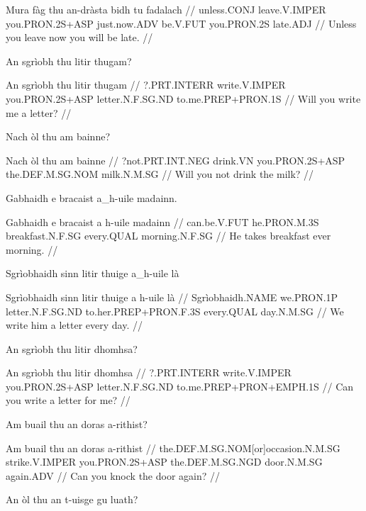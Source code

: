 \documentclass[a4paper,10pt]{article}
\begin{document}
\vspace{4mm}
\gla Mura fàg thu an-dràsta bidh tu fadalach  //
\glb unless.CONJ leave.V.IMPER you.PRON.2S+ASP just.now.ADV be.V.FUT you.PRON.2S late.ADJ  //
\glft Unless you leave now you will be late. //
\endgl
\xe

\ex
\begingl
\glpre An sgrìobh thu litir thugam? 

\vspace{4mm}
\gla An sgrìobh thu litir thugam  //
\glb ?.PRT.INTERR write.V.IMPER you.PRON.2S+ASP letter.N.F.SG.ND to.me.PREP+PRON.1S  //
\glft Will you write me a letter? //
\endgl
\xe

\ex
\begingl
\glpre Nach òl thu am bainne? 

\vspace{4mm}
\gla Nach òl thu am bainne  //
\glb ?not.PRT.INT.NEG drink.VN you.PRON.2S+ASP the.DEF.M.SG.NOM milk.N.M.SG  //
\glft Will you not drink the milk? //
\endgl
\xe

\ex
\begingl
\glpre Gabhaidh e bracaist a\_h-uile madainn. 

\vspace{4mm}
\gla Gabhaidh e bracaist {a h-uile} madainn  //
\glb can.be.V.FUT he.PRON.M.3S breakfast.N.F.SG every.QUAL morning.N.F.SG  //
\glft He takes breakfast ever morning. //
\endgl
\xe

\ex
\begingl
\glpre Sgrìobhaidh sinn litir thuige a\_h-uile là 

\vspace{4mm}
\gla Sgrìobhaidh sinn litir thuige {a h-uile} là  //
\glb Sgrìobhaidh.NAME we.PRON.1P letter.N.F.SG.ND to.her.PREP+PRON.F.3S every.QUAL day.N.M.SG  //
\glft We write him a letter every day. //
\endgl
\xe

\ex
\begingl
\glpre An sgrìobh thu litir dhomhsa? 

\vspace{4mm}
\gla An sgrìobh thu litir dhomhsa  //
\glb ?.PRT.INTERR write.V.IMPER you.PRON.2S+ASP letter.N.F.SG.ND to.me.PREP+PRON+EMPH.1S  //
\glft Can you write a letter for me? //
\endgl
\xe

\ex
\begingl
\glpre Am buail thu an doras a-rithist? 

\vspace{4mm}
\gla Am buail thu an doras a-rithist  //
\glb the.DEF.M.SG.NOM[or]occasion.N.M.SG strike.V.IMPER you.PRON.2S+ASP the.DEF.M.SG.NGD door.N.M.SG again.ADV  //
\glft Can you knock the door again? //
\endgl
\xe

\ex
\begingl
\glpre An òl thu an t-uisge gu luath? 
\end{document}
